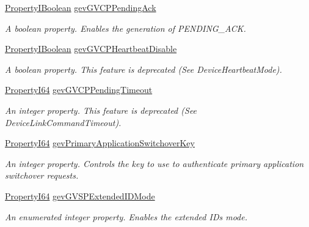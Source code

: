 \begin{DoxyCompactItemize}
\hyperlink{group___common_interface_ga44f9437e24b21b6c93da9039ec6786aa}{Property\+I\+Boolean} \hyperlink{classmv_i_m_p_a_c_t_1_1acquire_1_1_gen_i_cam_1_1_transport_layer_control_aab7a933037c24f38beb987d559c9d9d4}{gev\+G\+V\+C\+P\+Pending\+Ack}
\begin{DoxyCompactList}\small\item\em A boolean property. Enables the generation of P\+E\+N\+D\+I\+N\+G\+\_\+\+A\+C\+K. \end{DoxyCompactList}\item 
\hyperlink{group___common_interface_ga44f9437e24b21b6c93da9039ec6786aa}{Property\+I\+Boolean} \hyperlink{classmv_i_m_p_a_c_t_1_1acquire_1_1_gen_i_cam_1_1_transport_layer_control_a77e81761dc28f1064f3332f384b3977e}{gev\+G\+V\+C\+P\+Heartbeat\+Disable}
\begin{DoxyCompactList}\small\item\em A boolean property. This feature is deprecated (See Device\+Heartbeat\+Mode). \end{DoxyCompactList}\item 
\hyperlink{group___common_interface_ga81749b2696755513663492664a18a893}{Property\+I64} \hyperlink{classmv_i_m_p_a_c_t_1_1acquire_1_1_gen_i_cam_1_1_transport_layer_control_ac88bedde6797258a11f608d2123b02fa}{gev\+G\+V\+C\+P\+Pending\+Timeout}
\begin{DoxyCompactList}\small\item\em An integer property. This feature is deprecated (See Device\+Link\+Command\+Timeout). \end{DoxyCompactList}\item 
\hyperlink{group___common_interface_ga81749b2696755513663492664a18a893}{Property\+I64} \hyperlink{classmv_i_m_p_a_c_t_1_1acquire_1_1_gen_i_cam_1_1_transport_layer_control_a9d6fd70f178dce34a65474e5fa9c3f38}{gev\+Primary\+Application\+Switchover\+Key}
\begin{DoxyCompactList}\small\item\em An integer property. Controls the key to use to authenticate primary application switchover requests. \end{DoxyCompactList}\item 
\hyperlink{group___common_interface_ga81749b2696755513663492664a18a893}{Property\+I64} \hyperlink{classmv_i_m_p_a_c_t_1_1acquire_1_1_gen_i_cam_1_1_transport_layer_control_ae3437f11964375fddbad661cc5d000b3}{gev\+G\+V\+S\+P\+Extended\+I\+D\+Mode}
\begin{DoxyCompactList}\small\item\em An enumerated integer property. Enables the extended I\+Ds mode. \end{DoxyCompactList}\item 

\end{DoxyCompactItemize}
